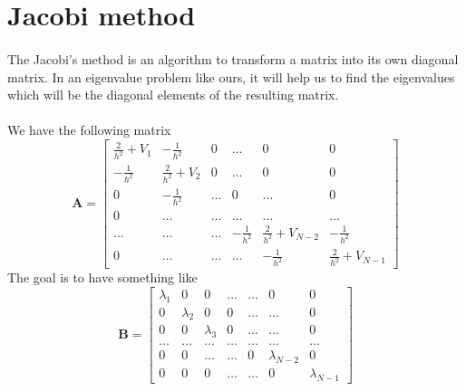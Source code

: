\documentclass[a4paper, twoside, 11pt]{report}
\theoremstyle{theorem}
\theoremstyle{remark}
\theoremstyle{exemple}
\begin{document}
    \section{Jacobi method}
    \paragraph{}The Jacobi's method is an algorithm to transform a matrix into its own diagonal matrix. In an eigenvalue problem like ours, it will help us to find the eigenvalues which will be the diagonal elements of the resulting matrix. 
    \paragraph{}We have the following matrix 
        \begin{equation*}
            \mathbf{A} = \begin{bmatrix} \frac{2}{h^2}+V_1 & -\frac{1}{h^2} & 0    & \dots  &0     & 0 \\
                                -\frac{1}{h^2} & \frac{2}{h^2}+V_2 & 0    & \dots  &0     &0 \\
                                0   & -\frac{1}{h^2} & \dots  &0       &\dots & 0\\
                                0	& \dots & \dots &\dots      &\dots & \dots\\
                                \dots   & \dots & \dots  &-\frac{1}{h^2}  &\frac{2}{h^2}+V_{N-2} & -\frac{1}{h^2}\\
                                0   & \dots & \dots  &\dots       &-\frac{1}{h^2} & \frac{2}{h^2}+V_{N-1}
             \end{bmatrix}
        \end{equation*}
    The goal is to have something like
        \begin{equation*}
            \mathbf{B} =\begin{bmatrix} \lambda_1 & 0 & 0 & \dots & \dots & 0 & 0 \\
                            0 & \lambda_2 & 0 & 0 & \dots & \dots & 0 \\
                            0 & 0 & \lambda_3 & 0 & \dots & \dots & 0 \\
                            \dots & \dots & \dots & \dots  &\dots &\dots & \dots \\
                            0 & 0 & \dots & \dots & 0 & \lambda_{N-2} & 0 \\
                            0 & 0 & 0 & \dots & \dots & 0 & \lambda_{N-1}
            \end{bmatrix}
        \end{equation*}
                    
\end{document}
